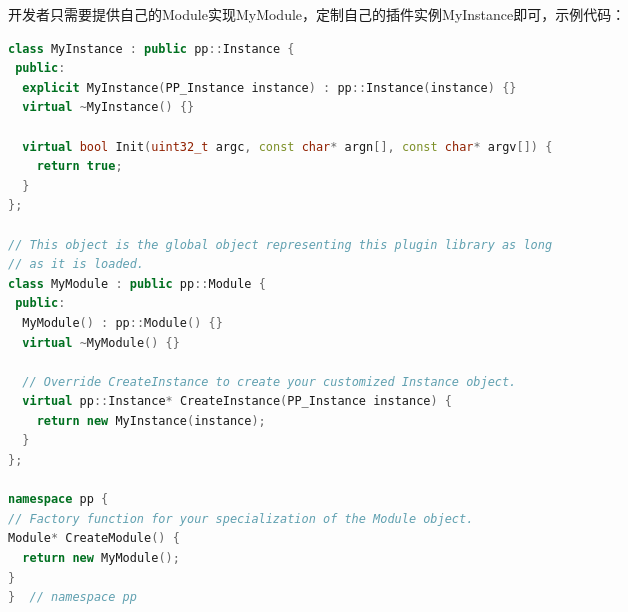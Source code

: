 \vspace{10ex}
开发者只需要提供自己的Module实现MyModule，定制自己的插件实例MyInstance即可，示例代码：
\begin{spacing}{1.0}
\begin{lstlisting}[language={C++}]
class MyInstance : public pp::Instance {
 public:
  explicit MyInstance(PP_Instance instance) : pp::Instance(instance) {}
  virtual ~MyInstance() {}

  virtual bool Init(uint32_t argc, const char* argn[], const char* argv[]) {
    return true;
  }
};

// This object is the global object representing this plugin library as long
// as it is loaded.
class MyModule : public pp::Module {
 public:
  MyModule() : pp::Module() {}
  virtual ~MyModule() {}

  // Override CreateInstance to create your customized Instance object.
  virtual pp::Instance* CreateInstance(PP_Instance instance) {
    return new MyInstance(instance);
  }
};

namespace pp {
// Factory function for your specialization of the Module object.
Module* CreateModule() {
  return new MyModule();
}
}  // namespace pp
\end{lstlisting}
\end{spacing}

